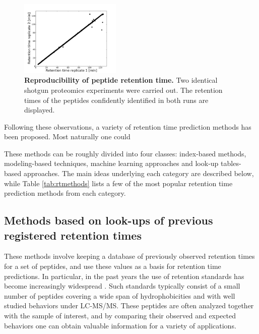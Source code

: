 \documentclass[a4paper]{article}
\begin{document}
\begin{figure}
\vspace{-10pt}
\centering
\includegraphics[trim=0.5cm 0cm 2cm 1.5cm, clip=true, width=0.43\textwidth]{img/reproducibility.pdf}
\caption{\label{fig:repr} {\bf Reproducibility of peptide retention time.} Two identical shotgun proteomics experiments were carried out. The retention times of the peptides confidently identified in both runs are displayed.}
\vspace{-25pt}
\end{figure}

Following these observations, a variety of retention time prediction
methods has been proposed. Most naturally one could 


These methods can be roughly divided into four classes: index-based
methods, modeling-based techniques, machine learning approaches and
look-up tables-based approaches. The main ideas underlying each
category are described below, while Table \ref{tab:rtmethods} lists a
few of the most popular retention time prediction methods from each
category.

\subsection{Methods based on look-ups of previous registered retention times}

These methods involve keeping a database of previously observed
retention times for a set of peptides, and use these values as a basis
for retention time predictions. In particular, in the past years the
use of retention standards has become increasingly
widespread \cite{olegstd, irt}. Such standards typically consist of a
small number of peptides covering a wide span of hydrophobicities and
with well studied behaviors under LC-MS/MS. These peptides are often
analyzed together with the sample of interest, and by comparing their
observed and expected behaviors one can obtain valuable information
for a variety of applications.
\end{document}
